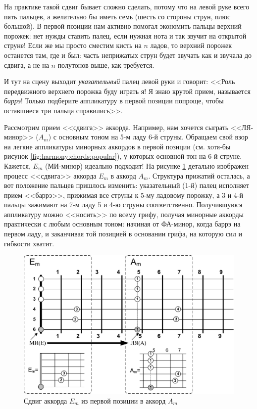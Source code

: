 На практике такой сдвиг бывает сложно сделать, потому что на левой руке всего пять пальцев, а желательно бы иметь семь (шесть со стороны струн, плюс большой). В первой позиции нам активно помогал экономить пальцы верхний порожек: нет нужды ставить палец, если нужная нота и так звучит на открытой струне! Если же мы просто сместим кисть на $n$ ладов, то верхний порожек останется там, где и был: часть неприжатых струн будет звучать как и звучала до сдвига, а не на $n$ полутонов выше, как требуется.

И тут на сцену выходит \emph{указательный} палец левой руки и говорит: <<Роль передвижного верхнего порожка буду играть я! Я знаю крутой прием, называется \emph{баррэ}! Только подберите аппликатуру в первой позиции попроще, чтобы оставшиеся три пальца справились>>.

Рассмотрим прием <<сдвига>> аккорда. Например, нам хочется сыграть <<ЛЯ-минор>> ($A_m$) с основным тоном на 5-м ладу 6-й струны. Обращаем свой взор на легкие аппликатуры минорных аккордов в первой позиции (см. хотя-бы рисунок \ref{fig:harmony:chords:popular}), у которых основной тон на 6-й струне. Кажется, $E_m$ (МИ-минор) идеально подходит! На рисунке \ref{fig:harmony:chords:shift} детально изображен процесс <<сдвига>> аккорда $E_m$ в аккорд $A_m$. Структура прижатий осталась, а вот положение пальцев пришлось изменить: указательный (1-й) палец исполняет прием <<баррэ>>, прижимая все струны к 5-му ладовому порожку, а 3 и 4-й пальцы зажимают на 7-м ладу 5 и 4-ю струны соответственно. Получившуюся аппликатуру можно <<носить>> по всему грифу, получая минорные аккорды практически с любым основным тоном: начиная от ФА-минор, когда баррэ на первом ладу, и заканчивая той позицией в основании грифа, на которую сил и гибкости хватит.

\begin{figure}[!ht]
    \centering
    \includegraphics[width=\textwidth]{fig/chords/shift} 
    \caption{Сдвиг аккорда $E_m$ из первой позиции в аккорд $A_m$}\label{fig:harmony:chords:shift}
\end{figure} 


